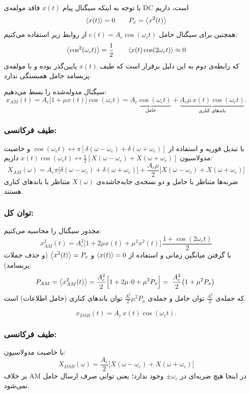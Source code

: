 با توجه به اینکه سیگنال پیام $x(t)$ فاقد مولفه‌ی DC است، داریم
\[
\left< x(t) \right> = 0
\qquad
P_x = \left< x^2(t) \right>
\]
همچنین برای سیگنال حامل $c(t) = A_c \cos(\omega_c t)$ از روابط زیر استفاده می‌کنیم:
\[
\left< \cos^2(\omega_c t) \right> = \frac{1}{2}
\qquad
\left< x(t)\cos(2\omega_c t) \right> \approx 0
\]
که رابطه‌ی دوم به این دلیل برقرار است که طیف $x(t)$ پایین‌گذر بوده و با مولفه‌ی پربسامد حامل همبستگی ندارد.


سیگنال مدوله‌شده را بسط می‌دهیم:
\[
x_{AM}(t) = A_c\big[1 + \mu x(t)\big]\cos(\omega_c t)
          = \underbrace{A_c \cos(\omega_c t)}_{\text{حامل}}
          + \underbrace{A_c\mu\, x(t)\cos(\omega_c t)}_{\text{باندهای کناری}}.
\]

\subsubsection*{طیف فرکانسی:}
 با تبدیل فوریه و استفاده از
$\cos(\omega_c t) \leftrightarrow \pi[\delta(\omega-\omega_c)+\delta(\omega+\omega_c)]$
و خاصیت مدولاسیون
$x(t)\cos(\omega_c t) \leftrightarrow \tfrac{1}{2}[X(\omega-\omega_c)+X(\omega+\omega_c)]$
داریم:
\[
\;
X_{AM}(\omega) = A_c\pi\big[\delta(\omega-\omega_c)+\delta(\omega+\omega_c)\big]
              + \frac{A_c\mu}{2}\big[X(\omega-\omega_c)+X(\omega+\omega_c)\big]
\;
\]
ضربه‌ها متناظر با حامل و دو نسخه‌ی جابه‌جاشده‌ی $X(\omega)$ متناظر با باندهای کناری هستند.

\subsubsection*{توان کل:}
 مجذور سیگنال را محاسبه می‌کنیم:
\[
x_{AM}^2(t) = A_c^2\big[1 + 2\mu x(t) + \mu^2 x^2(t)\big]\,\frac{1+\cos(2\omega_c t)}{2}
\]
با گرفتن میانگین زمانی و استفاده از $\left< x(t) \right>=0$ و $\left< x^2(t) \right>=P_x$ (و حذف جملات پربسامد):
\[
P_{AM} = \left< x_{AM}^2(t) \right>
       = \frac{A_c^2}{2}\Big[1 + 2\mu\!\cdot\!0 + \mu^2 P_x\Big]
       = {\;\frac{A_c^2}{2}\big(1 + \mu^2 P_x\big)\;}
\]
که جمله‌ی $\frac{A_c^2}{2}$ توان حامل و جمله‌ی $\frac{A_c^2}{2}\mu^2 P_x$ توان باندهای کناری (حامل اطلاعات) است.


\[
x_{DSB}(t) = A_c\, x(t)\cos(\omega_c t).
\]

\subsubsection*{طیف فرکانسی:}
 با خاصیت مدولاسیون:
\[
{\;
X_{DSB}(\omega) = \frac{A_c}{2}\big[X(\omega-\omega_c)+X(\omega+\omega_c)\big]
\;}
\]
بر خلاف AM در اینجا هیچ ضربه‌ای در $\pm\omega_c$ وجود ندارد؛ یعنی توانی صرف ارسال حامل نمی‌شود.

